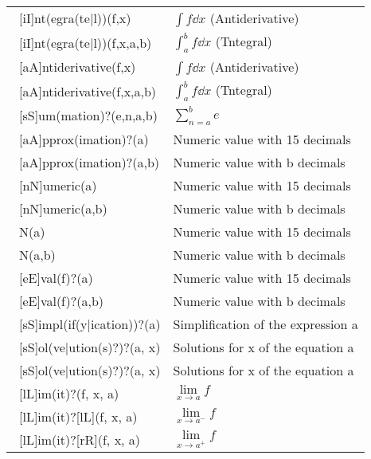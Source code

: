 \begin{longtable}{ll}
    \ [iI]nt(egra(te|l))(f,x) & $\int f \dd x$ (Antiderivative) \\
    \ [iI]nt(egra(te|l))(f,x,a,b) & $\int_a^b f \dd x$ (Tntegral) \\
    \ [aA]ntiderivative(f,x) & $\int f \dd x$ (Antiderivative) \\
    \ [aA]ntiderivative(f,x,a,b) & $\int_a^b f \dd x$ (Tntegral) \\
    \ [sS]um(mation)?(e,n,a,b) & $\sum\limits_{n=a}^b e$\\
    \ [aA]pprox(imation)?(a) & Numeric value with 15 decimals\\
    \ [aA]pprox(imation)?(a,b) & Numeric value with b decimals\\
    \ [nN]umeric(a) & Numeric value with 15 decimals\\
    \ [nN]umeric(a,b) & Numeric value with b decimals\\
    \ N(a) & Numeric value with 15 decimals\\
    \ N(a,b) & Numeric value with b decimals\\
    \ [eE]val(f)?(a) & Numeric value with 15 decimals\\
    \ [eE]val(f)?(a,b) & Numeric value with b decimals\\
    \ [sS]impl(if(y|ication))?(a) & Simplification of the expression a\\
    \ [sS]ol(ve|ution(s)?)?(a, x) & Solutions for x of the equation a\\
    \ [sS]ol(ve|ution(s)?)?(a, x) & Solutions for x of the equation a\\
    \ [lL]im(it)?(f, x, a) & $\lim\limits_{x\to a}f$\\
    \ [lL]im(it)?[lL](f, x, a) & $\lim\limits_{x\to a^-}f$\\
    \ [lL]im(it)?[rR](f, x, a) & $\lim\limits_{x\to a^+}f$\\
\end{longtable}


